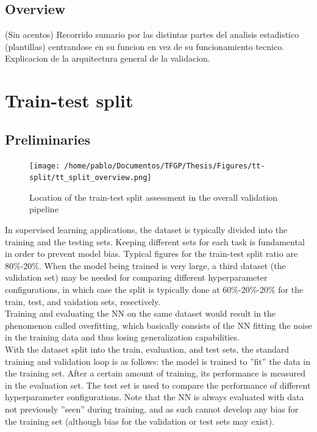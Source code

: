\subsection{Overview}
(Sin acentos) Recorrido sumario por las distintas partes del analisis estadistico (plantillas) centrandose en su funcion en vez de su funcionamiento tecnico. Explicacion de la arquitectura general de la validacion.\\ 
\section{Train-test split}
\subsection{Preliminaries}
\begin{figure}[!b]
	\centering
	\texttt{[image: /home/pablo/Documentos/TFGP/Thesis/Figures/tt-split/tt\_split\_overview.png]}
	\caption{Location of the train-test split assessment in the overall validation pipeline}
	\label{fig:esquemattsplit}
\end{figure}
\indent In supervised learning applications, the dataset is typically divided into the training and the testing sets. Keeping different sets for each task is fundamental in order to prevent model bias. Typical figures for the train-test split ratio are 80\%-20\%. When the model being trained is very large, a third dataset (the validation set) may be needed for comparing different hyperparameter configurations, in which case the split is typically done at 60\%-20\%-20\% for the train, test, and vaidation sets, resectively\cite[pp. 20-21]{Marsland2015Machine}.\\
%
\indent Training and evaluating the NN on the same dataset would result in the phenomenon called overfitting\cite[pp. 19-20]{Marsland2015Machine}, which basically consists of the NN fitting the noise in the training data and thus losing generalization capabilities.\\
%
\indent With the dataset split into the train, evaluation, and test sets, the standard training and validation loop is as follows: the model is trained to ''fit'' the data in the training set. After a certain amount of training, its performance is measured in the evaluation set. The test set is used to compare the performance of different hyperparameter configurations. Note that the NN is always evaluated with data not previously ''seen'' during training, and as such cannot develop any bias for the training set (although bias for the validation or test sets may exist).\\
